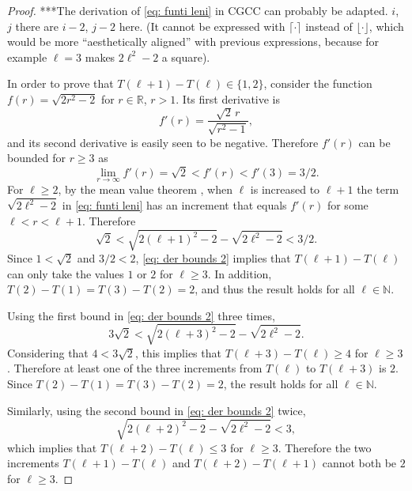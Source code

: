 \documentclass[12pt, a4paper]{article}
\newcommand{\funti}{T} %
\newcommand{\len}{\ell} %
\newcommand{\leni}{\ell} %
\newcommand{\genvar}{r}
\begin{document}
\begin{proof}
***The derivation of \eqref{eq: funti leni} in CGCC can probably be adapted. $i$, $j$ there are $i-2$, $j-2$ here. (It cannot be expressed with $\lceil \cdot \rceil$ instead of $\lfloor \cdot \rfloor$, which would be more ``aesthetically aligned'' with previous expressions, because for example $\len=3$ makes $2\len^2-2$ a square).


In order to prove that $\funti(\leni+1)-\funti(\leni) \in \{1,2\}$, consider the function $f(\genvar) = \sqrt{2\genvar^2-2}$ for $\genvar \in \mathbb R$, $\genvar>1$. Its first derivative is
\begin{equation}
f'(\genvar) = \frac {\sqrt{2} \, \genvar} {\sqrt{\genvar^2-1}},
\end{equation}
and its second derivative is easily seen to be negative. Therefore $f'(\genvar)$ can be bounded for $\genvar \geq 3$ as
\begin{equation}
\label{eq: der bounds}
\lim_{\genvar \rightarrow \infty} f'(\genvar) = \sqrt{2} < f'(\genvar) < f'(3) = 3/2.
\end{equation}
For $\leni \geq 2$, by the mean value theorem \cite[section~5.3]{Abbott15}, when $\leni$ is increased to $\leni+1$ the term $\sqrt{2\leni^2-2}$ in \eqref{eq: funti leni} has an increment that equals $f'(\genvar)$ for some $\leni < \genvar < \leni+1$. Therefore
\begin{equation}
\label{eq: der bounds 2}
\sqrt{2} < \sqrt{2(\leni+1)^2-2} - \sqrt{2\leni^2-2} < 3/2.
\end{equation}
Since $1 < \sqrt{2}$ and $3/2 < 2$, \eqref{eq: der bounds 2} implies that $\funti(\leni+1)-\funti(\leni)$ can only take the values $1$ or $2$ for $\leni \geq 3$. In addition, $\funti(2)-\funti(1) = \funti(3)-\funti(2) = 2$, and thus the result holds for all $\leni \in \mathbb N$.

Using the first bound in \eqref{eq: der bounds 2} three times,
\begin{equation}
3\sqrt{2} < \sqrt{2(\leni+3)^2-2} - \sqrt{2\leni^2-2}.
\end{equation}
Considering that $4 < 3\sqrt{2}$, this implies that $\funti(\leni+3)-\funti(\leni) \geq 4$ for $\leni \geq 3$. Therefore at least one of the three increments from $\funti(\leni)$ to $\funti(\leni+3)$ is $2$. Since $\funti(2)-\funti(1) = \funti(3)-\funti(2) = 2$, the result holds for all $\leni \in \mathbb N$.

Similarly, using the second bound in \eqref{eq: der bounds 2} twice,
\begin{equation}
\sqrt{2(\leni+2)^2-2} - \sqrt{2\leni^2-2} < 3,
\end{equation}
which implies that $\funti(\leni+2)-\funti(\leni) \leq 3$ for $\leni \geq 3$. Therefore the two increments $\funti(\leni+1)-\funti(\leni)$ and $\funti(\leni+2)-\funti(\leni+1)$ cannot both be $2$ for $\leni \geq 3$.
\end{proof}
\end{document}
